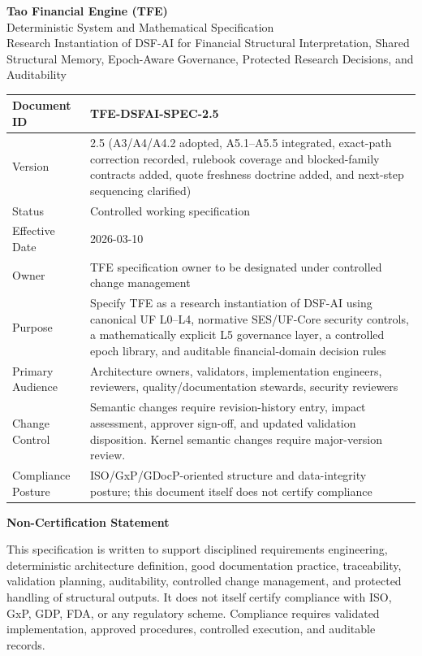 \documentclass[11pt]{report}
\begin{document}
\begin{titlepage}
\centering
{\Huge \textbf{Tao Financial Engine (TFE)}}\\[0.35cm]
{\LARGE Deterministic System and Mathematical Specification}\\[0.25cm]
{\Large Research Instantiation of DSF-AI for Financial Structural Interpretation, Shared Structural Memory, Epoch-Aware Governance, Protected Research Decisions, and Auditability}\\[0.9cm]

\renewcommand{\arraystretch}{1.18}
\begin{tabularx}{\textwidth}{|p{}|Y|}
\hline
Document ID & TFE-DSFAI-SPEC-2.5 \\\hline
Version & 2.5 (A3/A4/A4.2 adopted, A5.1--A5.5 integrated, exact-path correction recorded, rulebook coverage and blocked-family contracts added, quote freshness doctrine added, and next-step sequencing clarified) \\\hline
Status & Controlled working specification \\\hline
Effective Date & 2026-03-10 \\\hline
Owner & TFE specification owner to be designated under controlled change management \\\hline
Purpose & Specify TFE as a research instantiation of DSF-AI using canonical UF L0--L4, normative SES/UF-Core security controls, a mathematically explicit L5 governance layer, a controlled epoch library, and auditable financial-domain decision rules \\\hline
Primary Audience & Architecture owners, validators, implementation engineers, reviewers, quality/documentation stewards, security reviewers \\\hline
Change Control & Semantic changes require revision-history entry, impact assessment, approver sign-off, and updated validation disposition. Kernel semantic changes require major-version review. \\\hline
Compliance Posture & ISO/GxP/GDocP-oriented structure and data-integrity posture; this document itself does not certify compliance \\\hline
\end{tabularx}

\vfill
{\large \textbf{Non-Certification Statement}}\\[0.2cm]
\parbox{0.93\textwidth}{This specification is written to support disciplined requirements engineering, deterministic architecture definition, good documentation practice, traceability, validation planning, auditability, controlled change management, and protected handling of structural outputs. It does not itself certify compliance with ISO, GxP, GDP, FDA, or any regulatory scheme. Compliance requires validated implementation, approved procedures, controlled execution, and auditable records.}
\vfill
\end{titlepage}
\end{document}
